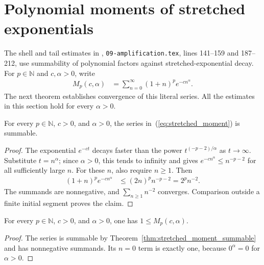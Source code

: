 \section{Polynomial moments of stretched exponentials}
\label{sec:stretched_exponential_summability}

The shell and tail estimates in \cite{OpenAI2026AreaLaw},
\texttt{09-amplification.tex}, lines 141--159 and 187--212, use
summability of polynomial factors against stretched-exponential decay.
For $p\in\mathbb N$ and $c,\alpha>0$, write
\begin{align}
    M_p(c,\alpha) & =\sum_{n=0}^{\infty}(1+n)^p e^{-cn^\alpha}.
    \label{eq:stretched_moment}
\end{align}
The next theorem establishes convergence of this literal series.
All the estimates in this section hold for every $\alpha>0$.

\begin{theorem}
    \label{thm:stretched_moment_summable}
    \leanok
    For every $p\in\mathbb N$, $c>0$, and $\alpha>0$, the series
    in~(\ref{eq:stretched_moment}) is summable.
\end{theorem}
\begin{proof}
    \leanok
    The exponential $e^{-ct}$ decays faster than the power
    $t^{(-p-2)/\alpha}$ as $t\to\infty$.  Substitute $t=n^\alpha$;
    since $\alpha>0$, this tends to infinity and gives
    $e^{-cn^\alpha}\leq n^{-p-2}$ for all sufficiently large $n$.
    For these $n$, also require $n\geq1$.  Then
    \begin{align}
        (1+n)^p e^{-cn^\alpha}
         & \leq (2n)^p n^{-p-2}=2^p n^{-2}.
        \label{eq:stretched_moment_comparison}
    \end{align}
    The summands are nonnegative, and $\sum_{n\geq1}n^{-2}$ converges.
    Comparison outside a finite initial segment proves the claim.
\end{proof}

\begin{theorem}
    \label{thm:stretched_moment_one_le}
    \leanok
    For every $p\in\mathbb N$, $c>0$, and $\alpha>0$, one has
    $1\leq M_p(c,\alpha)$.
\end{theorem}
\begin{proof}
    \leanok
    The series is summable by Theorem~\ref{thm:stretched_moment_summable}
    and has nonnegative summands.  Its $n=0$ term is exactly one,
    because $0^\alpha=0$ for $\alpha>0$.
\end{proof}

